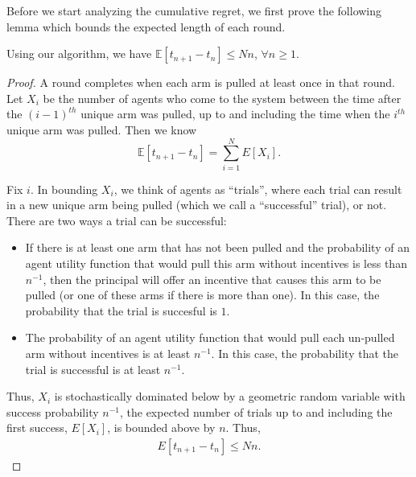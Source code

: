                   Before we start analyzing the cumulative regret, we first prove the following lemma which bounds the expected length of each round.

                  \begin{lemma}
                  Using our algorithm, we have $\mathbb{E}[t_{n+1}-t_{n}]\leq Nn$, $\forall n\geq 1$.
                  \label{round:length}
                  \end{lemma}


                  \begin{proof}
                  A round completes when each arm is pulled at least once in that round. Let $X_{i}$ be the number of agents who come to the system between the time after the $(i-1)^{th}$ unique arm was pulled, up to and including the time when the $i^{th}$ unique arm was pulled. Then we know 
                  \begin{equation*}
                  \mathbb{E}[t_{n+1}-t_{n}]=\sum_{i=1}^{N}E[X_{i}].
                  \end{equation*}


                  Fix $i$. In bounding $X_i$, we think of agents as ``trials'', where each trial can result in a new unique arm being pulled (which we call a ``successful'' trial), or not.  There are two ways a trial can be successful:
                  \begin{itemize}
                  \item If there is at least one arm that has not been pulled and the probability of an agent utility function that would pull this arm without incentives is less than $n^{-1}$, then the principal will offer an incentive that causes this arm to be pulled (or one of these arms if there is more than one). In this case, the probability that the trial is succesful is $1$.  
                  \item The probability of an agent utility function that would pull each un-pulled arm without incentives is at least $n^{-1}$. In this case, the probability that the trial is successful is at least $n^{-1}$.
                  \end{itemize}

                  Thus, $X_{i}$ is stochastically dominated below by a geometric random variable with success probability $n^{-1}$, the expected number of trials up to and including the first success, $E[X_i]$, is bounded above by $n$.  Thus,
                  \begin{align}
                  E[t_{n+1}-t_{n}]\leq Nn. \nonumber
                  \end{align}
                  \end{proof}


